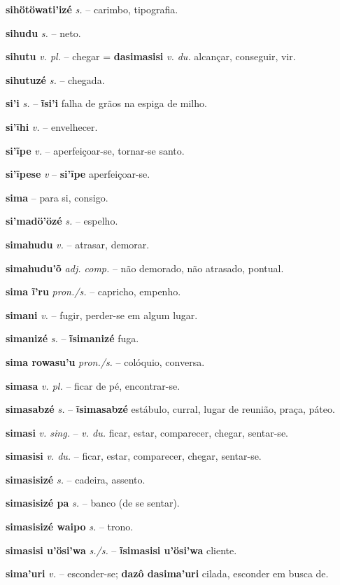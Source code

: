 \textbf{sihötöwati'izé} \textit{s.} -- carimbo, tipografia.

\textbf{sihudu} \textit{s.} -- neto.

\textbf{sihutu} \textit{v. pl.} -- chegar = \textbf{dasimasisi} \textit{v. du.} alcançar, conseguir, vir.

\textbf{sihutuzé} \textit{s.} -- chegada.

\textbf{si'i} \textit{s.} -- \textbf{ĩsi'i} falha de grãos na espiga de milho.

\textbf{si'ĩhi} \textit{v.} -- envelhecer.

\textbf{si'ĩpe} \textit{v.} -- aperfeiçoar-se, tornar-se santo.

\textbf{si'ĩpese} \textit{v} -- \textbf{si'ĩpe} aperfeiçoar-se.

\textbf{sima} -- para si, consigo.

\textbf{si'madö'özé} \textit{s.} -- espelho.

\textbf{simahudu} \textit{v.} -- atrasar, demorar.

\textbf{simahudu'õ} \textit{adj. comp.} -- não demorado, não atrasado, pontual.

\textbf{sima ĩ'ru} \textit{pron./s.} -- capricho, empenho.

\textbf{simani} \textit{v.} -- fugir, perder-se em algum lugar.

\textbf{simanizé} \textit{s.} -- \textbf{ĩsimanizé} fuga.

\textbf{sima rowasu'u} \textit{pron./s.} -- colóquio, conversa.

\textbf{simasa} \textit{v. pl.} -- ficar de pé, encontrar-se.

\textbf{simasabzé} \textit{s.} -- \textbf{ĩsimasabzé} estábulo, curral, lugar de reunião, praça, páteo.

\textbf{simasi} \textit{v. sing.} -- \textit{v. du.} ficar, estar, comparecer, chegar, sentar-se.

\textbf{simasisi} \textit{v. du.} -- ficar, estar, comparecer, chegar, sentar-se.

\textbf{simasisizé} \textit{s.} -- cadeira, assento.

\textbf{simasisizé pa} \textit{s.} -- banco (de se sentar).

\textbf{simasisizé waipo} \textit{s.} -- trono.

\textbf{simasisi u'ösi'wa} \textit{s./s.} -- \textbf{ĩsimasisi u'ösi'wa} cliente.

\textbf{sima'uri} \textit{v.} -- esconder-se; \textbf{dazô dasima'uri} cilada, esconder em busca de.


